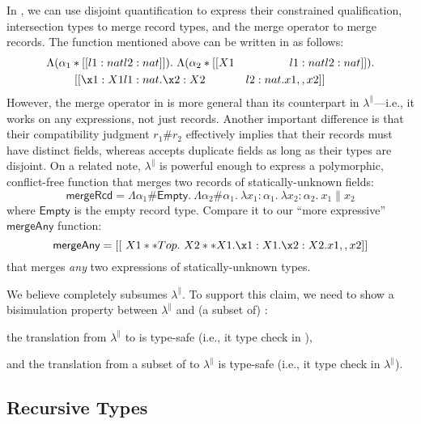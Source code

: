 In \fnamee, we can use disjoint quantification to express their constrained
qualification, intersection types to merge record types, and the merge operator
to merge records. The function mentioned above can be written in \fnamee as
follows:
\begin{align*}
  \Lambda (\alpha_1 * [[ {l1 : nat} & {l2 : nat} ]]) .\  \Lambda (\alpha_2 * [[  X1 & {l1 : nat} & {l2 : nat} ]]) . \\
  \qquad [[\x1 : X1 & {l1 : nat} . \x2 : X2 & {l2 : nat} . x1 ,, x2]]
\end{align*}
However, the merge operator in \fnamee is more general than its counterpart in
$\lambda^{\|}$---i.e., it works on any expressions, not just records. Another
important difference is that their compatibility judgment $r_1 \# r_2$
effectively implies that their records must have distinct fields, whereas
\fnamee accepts duplicate fields as long as their types are disjoint. On a
related note, $\lambda^{\|}$ is powerful enough to express a polymorphic,
conflict-free function that merges two records of statically-unknown fields:
\[
  \mathsf{mergeRcd} = \Lambda \alpha_1 \# \mathsf{Empty} .\ \Lambda \alpha_2 \# \alpha_1 .\ \lambda x_1 : \alpha_1 .\ \lambda x_2 : \alpha_2 .\ x_1 \| x_2
\]
where $\mathsf{Empty}$ is the empty record type. Compare it to our ``more expressive'' $\mathsf{mergeAny}$ function:
\[
  \mathsf{mergeAny} = [[\ X1 ** Top . \ X2 ** X1 . \x1 : X1 . \x2 : X2 . x1 ,, x2 ]]
\]
that merges \textit{any} two expressions of statically-unknown types.

We believe \fnamee completely subsumes $\lambda^{\|}$. To support this claim, we
need to show a bisimulation property between $\lambda^{\|}$ and (a subset of)
\fnamee:
\begin{inparaenum}[(1)]
\item the translation from $\lambda^{\|}$ to \fnamee is type-safe (i.e., it type check in \fnamee),
\item and the translation from a subset of \fnamee to $\lambda^{\|}$ is type-safe (i.e., it type check in $\lambda^{\|}$).
\end{inparaenum}


\subsection{Recursive Types}

